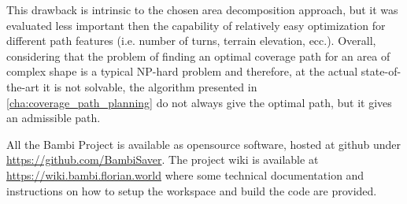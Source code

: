 This drawback is intrinsic to the chosen area decomposition approach, but it was evaluated less important then the capability of relatively easy optimization for different path features (i.e. number of turns, terrain elevation, ecc.).
Overall, considering that the problem of finding an optimal coverage path for an area of complex shape is a typical NP-hard problem and therefore, at the actual state-of-the-art it is not solvable, the algorithm presented in \autoref{cha:coverage_path_planning} do not always give the optimal path, but it gives an admissible path.\par
All the Bambi Project is available as opensource software, hosted at github under \url{https://github.com/BambiSaver}.
The project wiki is available at \url{https://wiki.bambi.florian.world} where some technical documentation and instructions on how to setup the workspace and build the code are provided.

